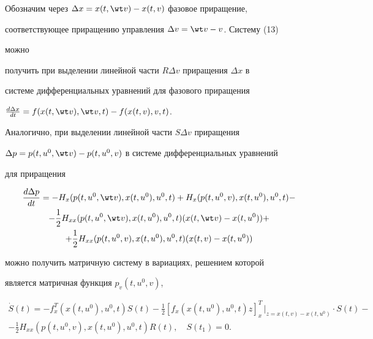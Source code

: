  


Обозначим через $\Delta x=x(t,\wt v)-x(t,v)$ фазовое приращение, 


соответствующее приращению управления $\Delta v=\wt v-v$. Систему (13) 


можно 


получить при выделении линейной части $R\Delta v$ приращения $\Delta x$ в 


системе дифференциальных уравнений для фазового приращения 


$\frac{d\Delta x}{d t}=f(x(t,\wt v),\wt v,t)-f(x(t,v),v,t)$. 


 


Аналогично, при выделении линейной части $S\Delta v$ приращения 


$\Delta p=p(t,u^0,\wt v)-p(t,u^0,v)$ в системе дифференциальных уравнений 


для приращения 


\begin{multline*} 


\frac{d\Delta p}{d t}=-H_x(p(t,u^0,\wt v),x(t,u^0),u^0,t)+ 


H_x(p(t,u^0,v),x(t,u^0),u^0,t)- \\ 


% 


-\frac{1}{2}H_{xx}(p(t,u^0,\wt v),x(t,u^0),u^0,t) 


(x(t,\wt v)-x(t,u^0))+ \\ 


% 


+\frac{1}{2}H_{xx}(p(t,u^0,v),x(t,u^0),u^0,t) 


(x(t,v)-x(t,u^0)) 


\end{multline*} 


можно получить матричную систему в вариациях, решением которой 


является матричная функция $p_v(t,u^0,v)$, 


\begin{multline} 


\Dot S(t)=-f^T_x(x(t,u^0),u^0,t)S(t)-\frac{1}{2} 


[f_x(x(t,u^0),u^0,t)z]^T_x\,\big|_{z=x(t,v)-x(t,u^0)}\cdot S(t)- \\ 


% 


-\frac{1}{2}H_{xx}(p(t,u^0,v),x(t,u^0),u^0,t)R(t),\quad S(t_1)=0. 


\end{multline} 


